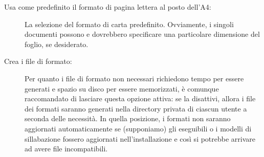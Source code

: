 \documentclass{article}
\begin{document}
\begin{description}
\item[Usa come predefinito il formato di pagina lettera al posto dell'A4:]
  La selezione del formato di carta predefinito. Ovviamente, i singoli
  documenti possono e dovrebbero specificare una particolare dimensione
  del foglio, se desiderato.

\item[Crea i file di formato:] Per quanto i file di formato non necessari
  richiedono tempo per essere generati e spazio su disco per essere
  memorizzati, è comunque raccomandato di lasciare questa opzione attiva:
  se la disattivi, allora i file dei formati saranno generati nella
  directory  privata di ciascun utente a seconda delle
  necessità. In quella posizione, i formati non saranno aggiornati
  automaticamente se (supponiamo) gli eseguibili o i modelli di
  sillabazione fossero aggiornati nell'installazione e così si potrebbe
  arrivare ad avere file incompatibili.

\begin{comment}
\item[Esecuzione di una ristretta lista di programmi:] A partire da \TL\
  2009, l'esecuzione di alcuni programmi esterni è consentita di base. La
  lista di tali programmi è fornita in \filename{texmf.cnf}; è molto
  piccola, ma comunque molto utile. Consulta le novità dell'edizione 2009
  (section~\ref{sec:2009news}) per maggiori dettagli.
\end{comment}


\end{description}
\end{document}
